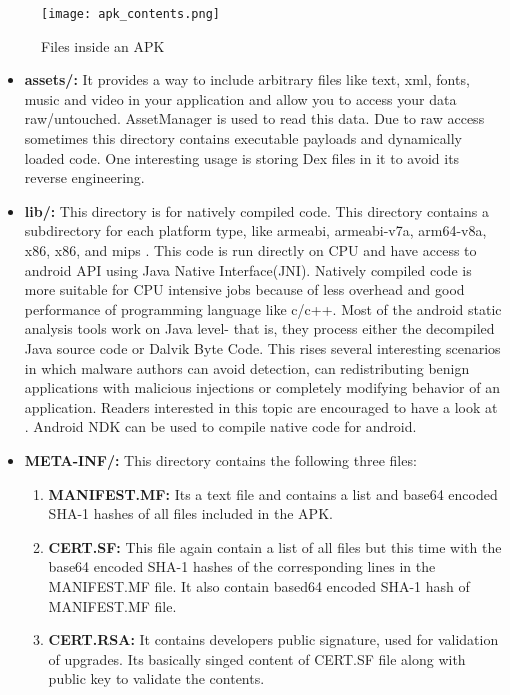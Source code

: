 \documentclass[../main.tex]{subfile}
\begin{document}
		\begin{figure}[h]
			\centering
			\texttt{[image: apk\_contents.png]}
			\caption{Files inside an APK}
		\end{figure}
		
		\begin{itemize}
			\item \textbf{assets/:} It provides a way to include arbitrary files like text, xml, fonts, music and video in your application and allow you to access your data raw/untouched. AssetManager is used to read this data\cite{android_assets}. Due to raw access sometimes this directory contains executable payloads and dynamically loaded code. One interesting usage is storing Dex files in it to avoid its reverse engineering. \cite{lim2016android}
			
			\item \textbf{lib/:} This directory is for natively compiled code. This directory contains a subdirectory for each platform type, like armeabi, armeabi-v7a, arm64-v8a, x86, x86, and mips \cite{APK_structure}. This code is run directly on CPU and have access to android API using Java Native Interface(JNI). Natively compiled code is more suitable for CPU intensive jobs because of less overhead and good performance of programming language like c/c++. Most of the android  static analysis tools work on Java level- that is, they process either the decompiled Java source code or Dalvik Byte Code\cite{afonso2016going}. This rises several interesting scenarios in which malware authors can avoid detection, can redistributing benign applications with malicious injections or completely modifying behavior of an application. Readers interested in this topic are encouraged to have a look at \cite{afonso2016going}. Android NDK can be used to compile native code for android.
			
			
			\item \textbf{META-INF/:} This directory contains the following three files:
			\begin{enumerate}
				\item \textbf{MANIFEST.MF:} Its a text file and contains a list and base64 encoded SHA-1 hashes of all files included in the APK.
				\item \textbf{CERT.SF:} This file again contain a list of all files but this time with the base64 encoded SHA-1 hashes of the corresponding lines in the MANIFEST.MF file. It also contain based64 encoded SHA-1 hash of MANIFEST.MF file.
				\item \textbf{CERT.RSA:} It contains developers public signature, used for validation of upgrades. Its basically singed content of CERT.SF file along with public key to validate the contents.
			\end{enumerate}
			

\end{itemize}
\end{document}
